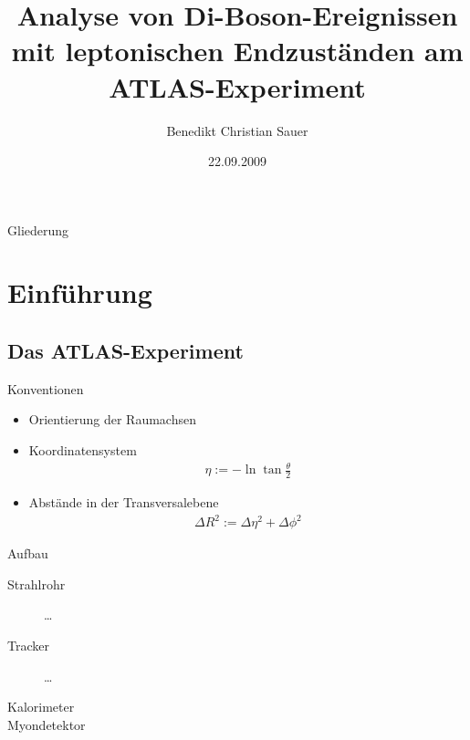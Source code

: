 \documentclass{beamer}
\title[Analyse von Di-Boson-Ereignissen]{Analyse von Di-Boson-Ereignissen mit
leptonischen Endzuständen am ATLAS-Experiment
}
\author[B. Sauer]{Benedikt Christian Sauer}
\institute{Bachelorarbeit am Physikalischen Institut der Universität Bonn}
\date{22.09.2009}
\begin{document}
\begin{frame}
  \titlepage
\end{frame}

\begin{frame}{Gliederung}
  \tableofcontents[pausesections]
\end{frame}

\section{Einführung}
\subsection{Das ATLAS-Experiment}

\begin{frame}{Konventionen}
  \begin{itemize}
    \item Orientierung der Raumachsen
      \pause
    \item Koordinatensystem
      \pause
      \begin{align}
        \eta := -\ln{\tan{\frac \theta 2}}
      \end{align}
      \pause
    \item Abstände in der Transversalebene
      \begin{align}
        \Delta R^2 := \Delta\eta^2 + \Delta\phi^2
      \end{align}
  \end{itemize}
\end{frame}

\begin{frame}{Aufbau}
  \begin{description}
    \item[Strahlrohr] \dots
    \item[Tracker] \dots
    \item[Kalorimeter]
    \item[Myondetektor]
  \end{description}
\end{frame}
\end{document}
